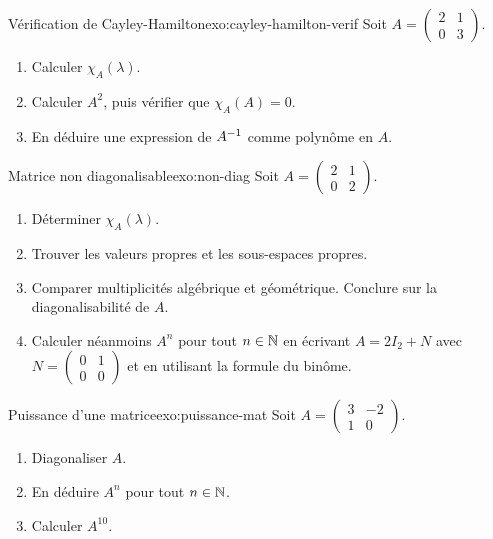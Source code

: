 \begin{exercise}{\basic{} Vérification de Cayley-Hamilton}{exo:cayley-hamilton-verif}
  Soit $A=\begin{pmatrix}2&1\\0&3\end{pmatrix}$.
  \begin{enumerate}[label=(\alph*)]
    \item Calculer $\chi_A(\lambda)$.
    \item Calculer $A^2$, puis vérifier que $\chi_A(A)=0$.
    \item En déduire une expression de ${A}^{-1}$ comme polynôme en $A$.
  \end{enumerate}
\end{exercise}

\begin{exercise}{\intermediate{} Matrice non diagonalisable}{exo:non-diag}
  Soit $A=\begin{pmatrix}2&1\\0&2\end{pmatrix}$.
  \begin{enumerate}[label=(\alph*)]
    \item Déterminer $\chi_A(\lambda)$.
    \item Trouver les valeurs propres et les sous-espaces propres.
    \item Comparer multiplicités algébrique et géométrique. Conclure
      sur la diagonalisabilité de $A$.
    \item Calculer néanmoins $A^n$ pour tout $n\in{\mathbb{N}}$ en écrivant
      $A=2I_2+N$ avec $N=\begin{pmatrix}0&1\\0&0\end{pmatrix}$ et
      en utilisant la formule du binôme.
  \end{enumerate}
\end{exercise}

\begin{exercise}{\intermediate{} Puissance d'une matrice}{exo:puissance-mat}
  Soit $A=\begin{pmatrix}3&-2\\1&0\end{pmatrix}$.
  \begin{enumerate}[label=(\alph*)]
    \item Diagonaliser $A$.
    \item En déduire $A^n$ pour tout $n\in{\mathbb{N}}$.
    \item Calculer $A^{10}$.
  \end{enumerate}
\end{exercise}

